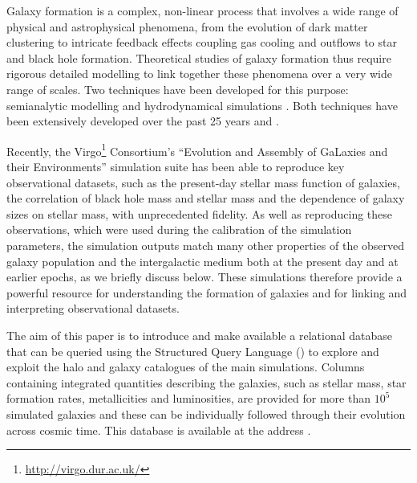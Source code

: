 Galaxy formation is a complex, non-linear process that involves a wide range of
physical and astrophysical phenomena, from the evolution of dark matter
clustering to intricate feedback effects coupling gas cooling and outflows to
star and black hole formation. Theoretical studies of galaxy formation thus
require rigorous detailed modelling to link together these phenomena over a very
wide range of scales. Two techniques have been developed for this purpose:
semianalytic modelling \citep{White1991} and hydrodynamical simulations
\citep{Carlberg1990,Katz1992}. Both techniques have been extensively developed
over the past 25 years \citep[e.g.][for semi-analytic
  models]{Porter2014,Henriques2015,Lacey2015} and \citep[e.g.][for hydrodynamical
  simulations]{Oppenheimer2010,Puchwein2013,
  Dubois2014,Okamoto2014,Vogelsberger2014,Khandai2015}.

Recently, the Virgo\footnote{\url{http://virgo.dur.ac.uk/}} Consortium's
``Evolution and Assembly of GaLaxies and their Environments'' simulation suite
\citep[\eagle,][]{Schaye2015,Crain2015} has been able to reproduce key
observational datasets, such as the present-day stellar mass function of
galaxies, the correlation of black hole mass and stellar mass and the dependence
of galaxy sizes on stellar mass, with unprecedented fidelity. As well as
reproducing these observations, which were used during the calibration of the
simulation parameters, the simulation outputs match many other properties of the
observed galaxy population and the intergalactic medium both at the present day
and at earlier epochs, as we briefly discuss below. These simulations therefore
provide a powerful resource for understanding the formation of galaxies and for
linking and interpreting observational datasets.

The aim of this paper is to introduce and make available a relational database
that can be queried using the Structured Query Language (\sql) to explore and
exploit the halo and galaxy catalogues of the main \eagle simulations. Columns
containing integrated quantities describing the galaxies, such as stellar mass,
star formation rates, metallicities and luminosities, are provided for more than
$10^5$ simulated galaxies and these can be individually followed through their
evolution across cosmic time. This database is available at the address
\dbAddress.

